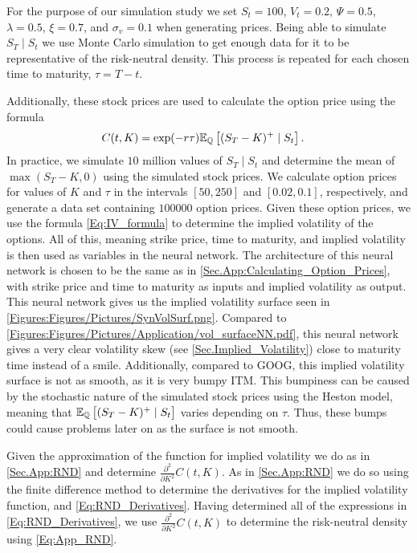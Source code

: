 For the purpose of our simulation study we set $S_t=100$, $V_t=0.2$, $\Psi=0.5$, $\lambda=0.5$, $\xi=0.7$, and $\sigma_v=0.1$ when generating prices. Being able to simulate $S_T\mid S_t$ we use Monte Carlo simulation \citep[p. 267]{Hull} to get enough data for it to be representative of the risk-neutral density. This process is repeated for each chosen time to maturity, $\tau=T-t$. 

Additionally, these stock prices are used to calculate the option price using the formula
\begin{align}
    C(t,K) &= \exp(-r\tau)\E[\Q]{(S_T-K)^+\mid S_t}.
\end{align}
In practice, we simulate $10$ million values of $S_T\mid S_t$ and determine the mean of $\max(S_T-K,0)$ using the simulated stock prices. We calculate option prices for values of $K$ and $\tau$ in the intervals $[50,250]$ and $[0.02,0.1]$, respectively, and generate a data set containing $100000$ option prices. Given these option prices, we use the formula \eqref{Eq:IV_formula} to determine the implied volatility of the options. All of this, meaning strike price, time to maturity, and implied volatility is then used as variables in the neural network. The architecture of this neural network is chosen to be the same as in \autoref{Sec.App:Calculating_Option_Prices}, with strike price and time to maturity as inputs and implied volatility as output. This neural network gives us the implied volatility surface seen in \autoref{Figures:Figures/Pictures/SynVolSurf.png}. Compared to \autoref{Figures:Figures/Pictures/Application/vol_surfaceNN.pdf}, this neural network gives a very clear volatility skew (see \autoref{Sec.Implied_Volatility}) close to maturity time instead of a smile. Additionally, compared to GOOG, this implied volatility surface is not as smooth, as it is very bumpy ITM. This bumpiness can be caused by the stochastic nature of the simulated stock prices using the Heston model, meaning that $\E[\Q]{(S_T-K)^+\mid S_t}$ varies depending on $\tau$. Thus, these bumps could cause problems later on as the surface is not smooth.


Given the approximation of the function for implied volatility we do as in \autoref{Sec.App:RND} and determine $\frac{\partial^2}{\partial K^2}C(t,K)$. As in \autoref{Sec.App:RND} we do so using the finite difference method to determine the derivatives for the implied volatility function, and \eqref{Eq:RND_Derivatives}. Having determined all of the expressions in \eqref{Eq:RND_Derivatives}, we use $\frac{\partial^2}{\partial K^2}C(t,K)$ to determine the risk-neutral density using \eqref{Eq:App_RND}.

